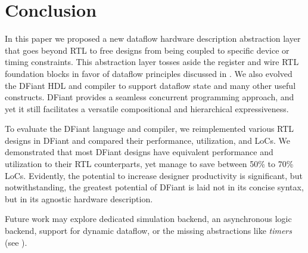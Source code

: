 \section{Conclusion}
\label{sec:conclusion}
In this paper we proposed a new dataflow hardware description abstraction layer that goes beyond RTL to free designs from being coupled to specific device or timing constraints. This abstraction layer tosses aside the register and wire RTL foundation blocks in favor of dataflow principles discussed in . We also evolved the DFiant HDL and compiler to support dataflow state and many other useful constructs. DFiant provides a seamless concurrent programming approach, and yet it still facilitates a versatile compositional and hierarchical expressiveness. 

To evaluate the DFiant language and compiler, we reimplemented various RTL designs in DFiant and compared their performance, utilization, and LoCs. We demonstrated that most DFiant designs have equivalent performance and utilization to their RTL counterparts, yet manage to save between 50\% to 70\% LoCs. Evidently, the potential to increase designer productivity is significant, but notwithstanding, the greatest potential of DFiant is laid not in its concise syntax, but in its agnostic hardware description.  


Future work may explore dedicated simulation backend, an asynchronous logic backend, support for dynamic dataflow, or the missing abstractions like \emph{timers} (see ).
